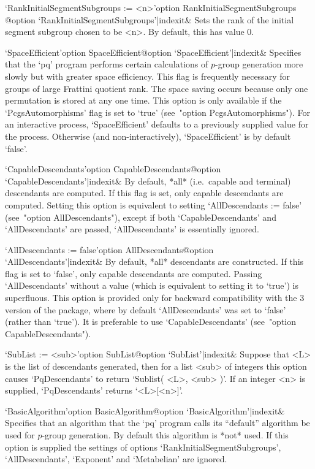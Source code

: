 \>`RankInitialSegmentSubgroups := <n>'{option RankInitialSegmentSubgroups}%
@{option `RankInitialSegmentSubgroups'|indexit}&
Sets the rank of the initial  segment  subgroup  chosen  to  be  <n>.  By
default, this has value 0.

\>`SpaceEfficient'{option SpaceEfficient}@{option `SpaceEfficient'|indexit}&
Specifies that the `pq' program performs certain calculations of $p$-group
generation more slowly  but with greater space efficiency.   This flag is
frequently  necessary for groups  of large  Frattini quotient  rank.  The
space saving  occurs because  only one permutation  is stored at  any one
time. This  option is only  available if the `PcgsAutomorphisms'  flag is
set  to  `true'  (see~"option  PcgsAutomorphisms").  For  an  interactive
process, `SpaceEfficient' defaults to a previously supplied value for the
process.   Otherwise  (and  non-interactively),  `SpaceEfficient'  is  by
default `false'.


\>`CapableDescendants'{option CapableDescendants}@{option `CapableDescendants'|indexit}&
By default, *all* (i.e.~capable and terminal) descendants  are  computed.
If this flag is set, only capable descendants are computed. Setting  this
option is equivalent to setting `AllDescendants  :=  false'  (see~"option
AllDescendants"),    except    if    both    `CapableDescendants'     and
`AllDescendants' are passed, `AllDescendants' is essentially ignored.

\>`AllDescendants := false'{option AllDescendants}@{option `AllDescendants'|indexit}&
By default, *all* descendants are constructed. If this  flag  is  set  to
`false', only capable descendants are computed. Passing  `AllDescendants'
without a value  (which  is  equivalent  to  setting  it  to  `true')  is
superfluous. This option is provided only for backward compatibility with
the  {\GAP}  3  version  of  the  {\ANUPQ}  package,  where  by   default
`AllDescendants'  was  set  to  `false'  (rather  than  `true').  It   is
preferable to use `CapableDescendants' (see~"option CapableDescendants").

\>`SubList := <sub>'{option SubList}@{option `SubList'|indexit}&
Suppose that <L> is the list of descendants generated, then  for  a  list
<sub> of integers this option causes `PqDescendants' to return  `Sublist(
<L>, <sub> )'. If an integer <n>  is  supplied,  `PqDescendants'  returns
`<L>[<n>]'.

\>`BasicAlgorithm'{option BasicAlgorithm}@{option `BasicAlgorithm'|indexit}&
Specifies that an  algorithm that the `pq' program  calls its ``default''
algorithm be  used for $p$-group generation. By default this algorithm is
*not*  used.   If  this  option  is  supplied  the  settings  of  options
`RankInitialSegmentSubgroups',     `AllDescendants',    `Exponent'    and
`Metabelian' are ignored.

